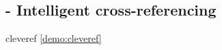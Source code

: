 
\subsection{ - Intelligent cross-referencing}

\begin{demo}{}{cleveref}
	\cref{demo:cleveref}
\end{demo}
